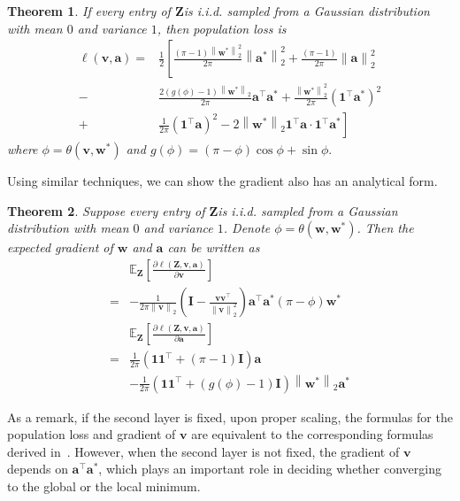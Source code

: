 \documentclass{article}
\newcommand{\firstlayer}{w}
\newcommand{\firstlayerWN}{v}
\newcommand{\secondlayer}{a}
\newcommand{\mat}[1]{\mathbf{#1}}
\newcommand{\vect}[1]{\mathbf{#1}}
\newcommand{\norm}[1]{\left\|#1\right\|}
\newcommand{\expect}{\mathbb{E}}
\newtheorem{thm}{Theorem}[section]
\begin{document}
\begin{thm}\label{thm:gaussian_input_obj_WN}
If every entry of $\mat{Z}$is  i.i.d. sampled from a Gaussian distribution with mean $0$ and variance $1$, then  population loss is
\begin{align}
\ell\left(\vect{\firstlayerWN},\vect{\secondlayer}\right)= & \frac{1}{2}\left[\frac{\left(\pi-1\right)\norm{\vect{w}^*}_2^2}{2\pi}\norm{\vect{\secondlayer}^*}_2^2 + \frac{\left(\pi-1\right)}{2\pi}\norm{\vect{\secondlayer}}_2^2 \right. \nonumber\\
- & \left.\frac{2\left(g\left(\phi\right)-1\right)\norm{\vect{\firstlayer}^*}_2}{2\pi} \vect{\secondlayer}^\top \vect{\secondlayer}^* +  \frac{\norm{\vect{\firstlayer}^*}_2^2}{2\pi} \left(\vect{1}^\top \vect{\secondlayer}^*\right)^2 \right. \nonumber\\
+ &\left. \frac{1}{2\pi}\left(\vect{1}^\top\vect{\secondlayer}\right)^2 - 2\norm{\vect{\firstlayer}^*}_2\vect{1}^\top\vect{\secondlayer}\cdot\vect{1}^\top\vect{\secondlayer}^*
\right]
\label{eqn:gaussian_input_obj_WN}
\end{align}
where $\phi = \theta\left(\vect{\firstlayerWN},\vect{\firstlayer}^*\right)$ and $g(\phi) = (\pi-\phi)\cos \phi+\sin\phi.$
\end{thm}Using similar techniques, we can show the gradient also has an analytical form.
\begin{thm}\label{thm:expected_gradient_WN}
Suppose every entry of $\mat{Z}$is  i.i.d. sampled from a Gaussian distribution with mean $0$ and variance $1$. 
Denote $\phi=\theta\left(\vect{w},\vect{w}^*\right)$.
Then the expected gradient of $\vect{w}$ and $\vect{\secondlayer}$ can be written as \begin{align*}
&\expect_{\mat{Z}}\left[\frac{\partial \ell\left(\mat{Z},\vect{\firstlayerWN},\vect{\secondlayer}\right)}{\partial \vect{\firstlayerWN}}\right]\\  = 
&-\frac{1}{2\pi\norm{\vect{\firstlayerWN}}_2}\left(\mat{I}-\frac{\vect{\firstlayerWN}\vect{\firstlayerWN}^\top}{\norm{\vect{\firstlayerWN}}_2^2}\right)\vect{\secondlayer}^\top \vect{\secondlayer}^*\left(\pi-\phi\right)\vect{w}^*\\
&\expect_{\mat{Z}}\left[\frac{\partial \ell\left(\mat{Z},\vect{\firstlayerWN},\vect{\secondlayer}\right)}{\partial \vect{\secondlayer}}\right] \\
= &\frac{1}{2\pi}\left(\vect{1}\vect{1}^\top + \left(\pi-1\right)\mat{I}\right)\vect{\secondlayer} \\
& -\frac{1}{2\pi}\left(\vect{1}\vect{1}^\top + \left(g(\phi)-1\right)\mat{I}\right)\norm{\vect{w}^*}_2\vect{\secondlayer}^*
\end{align*}
\end{thm}
As a remark, if the second layer is fixed, upon proper scaling, the formulas for the population loss and gradient of $\vect{\firstlayerWN}$ are equivalent to the corresponding formulas derived in~\citep{brutzkus2017globally,cho2009kernel}.
However, when the second layer is not fixed, the gradient of $\vect{\firstlayerWN}$ depends on $\vect{\secondlayer}^\top \vect{\secondlayer}^*$, which plays an important role in deciding whether converging to the global or the local minimum.
\end{document}
